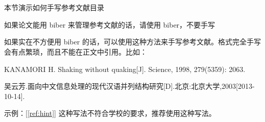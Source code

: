 \chapter{\bibname}

\begin{manref}
\item \label{ref:hint} 本节演示如何手写参考文献目录
\item 如果论文能用 biber 来管理参考文献的话，请使用 biber，不要手写
\item 如果实在不方便用 biber 的话，可以使用这种方法来手写参考文献。格式完全手写会有点繁琐，而且不能在正文中引用。比如：
\item \label{ref:man} KANAMORI H. Shaking without quaking[J]. Science, 1998, 279(5359): 2063.
\item 吴云芳.面向中文信息处理的现代汉语并列结构研究[D].北京:北京大学,2003[2013-10-14].
\end{manref}

示例：[\ref{ref:hint}] 这种写法不符合学校的要求，推荐使用这种写法。
